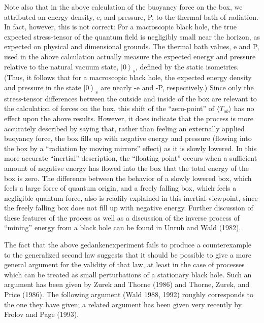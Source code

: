\documentclass[11pt,a4paper]{article}
\providecommand{\ket}[1]{\left\lvert#1\right\rangle}
\begin{document}
Note also that in the above calculation of the buoyancy force on the box, we attributed an energy density, e, and pressure, P, to the thermal bath of radiation. In fact, however, this is not correct: For a macroscopic black hole, the true expected stress-tensor of the quantum field is negligibly small near the horizon, as expected on physical and dimensional grounds. The thermal bath values, e and P, used in the above calculation actually measure the expected energy and pressure relative to the natural vacuum state, \(\ket0_s\), defined by the static isometries. (Thus, it follows that for a macroscopic black hole, the expected energy density and pressure in the state \(\ket{0}_s\) are nearly -e and -P, respectively.) Since only the stress-tensor differences between the outside and inside of the box are relevant to the calculation of forces on the box, this shift of the ``zero-point'' of \(\langle T_{ab} \rangle\) has no effect upon the above results. However, it does indicate that the process is more accurately described by saying that, rather than feeling an externally applied buoyancy force, the box fills up with negative energy and pressure (flowing into the box by a ``radiation by moving mirrors'' effect) as it is slowly lowered. In this more accurate ``inertial'' description, the ``floating point'' occurs when a sufficient amount of negative energy has flowed into the box that the total energy of the box is zero. The difference between the behavior of a slowly lowered box, which feels a large force of quantum origin, and a freely falling box, which feels a negligible quantum force, also is readily explained in this inertial viewpoint, since the freely falling box does not fill up with negative energy. Further discussion of these features of the process as well as a discussion of the inverse process of ``mining'' energy from a black hole can be found in Unruh and Wald (1982).

The fact that the above gedankenexperiment fails to produce a counterexample to the generalized second law suggests that it should be possible to give a more general argument for the validity of that law, at least in the case of processes which can be treated as small perturbations of a stationary black hole. Such an argument has been given by Zurek and Thorne (1986) and Thorne, Zurek, and Price (1986). The following argument (Wald 1988, 1992) roughly corresponds to the one they have given; a related argument has been given very recently by Frolov and Page (1993).

\hypertarget{source-185}{}
\end{document}
